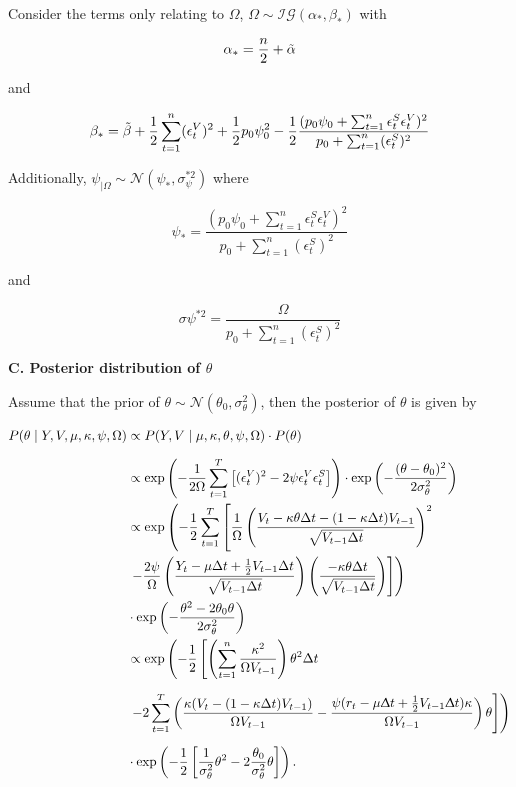 \documentclass[12pt,a4paper]{article}
\numberwithin{equation}{section}
\begin{document}
Consider the terms only relating to $\Omega$, $\Omega \sim \mathcal{IG}(\alpha_*, \beta_*)$ with

\[\alpha_* = \frac{n}{2} + \Tilde{\alpha}\] 

and 

\[\beta_* = \Tilde{\beta} + \frac{1}{2} \sum_{t=1}^n (\epsilon_t^V)^2 + \frac{1}{2} p_0 \psi_0^2 - \frac{1}{2} \frac{(p_0 \psi_0 + \sum_{t=1}^n \epsilon_t^S \epsilon_t^V)^2}{p_0 + \sum_{t=1}^n (\epsilon_t^S )^2} \] 

Additionally, $\psi_{|\Omega} \sim \mathcal{N} (\psi_*, \sigma_\psi^{*2})$ where

\[\psi_* =\frac{(p_0 \psi_0 + \sum_{t=1}^n \epsilon_t^S \epsilon_t^V)^2}{p_0 + \sum_{t=1}^n (\epsilon_t^S )^2} \]

and 

\[\sigma\psi^{*2} = \frac{\Omega}{p_0 + \sum_{t=1}^n (\epsilon_t^S)^2 }\]

\vspace{1em}

\textbf{C. Posterior distribution of $\theta$}

\vspace{1em}

Assume that the prior of $\theta \sim \mathcal{N}(\theta_0, \sigma_\theta^2)$, then the posterior of $\theta$ is given by

\begin{align*}
P(\theta \mid Y, V, \mu, \kappa, \psi, \Omega) & \propto P(Y, V \mid \mu, \kappa, \theta, \psi, \Omega) \cdot P(\theta) \\[0.6em]
& \propto \exp\left( -\frac{1}{2\Omega} \sum_{t=1}^{T} \left[ (\epsilon_t^V)^2 - 2\psi \epsilon_t^V \epsilon_t^S \right] \right) \cdot \exp\left( -\frac{(\theta - \theta_0)^2}{2\sigma_\theta^2} \right)\\
& \propto \exp\left( -\frac{1}{2} \sum_{t=1}^{T} \left[ \frac{1}{\Omega} \left( \frac{V_t - \kappa \theta \Delta t - (1 - \kappa \Delta t)V_{t-1}}{\sqrt{V_{t-1} \Delta t}} \right)^2 \right. \right. \\
& \left. \left. - \frac{2\psi}{\Omega} \left( \frac{Y_t - \mu \Delta t + \frac{1}{2} V_{t-1} \Delta t}{\sqrt{V_{t-1} \Delta t}} \right) \left( \frac{-\kappa \theta \Delta t}{\sqrt{V_{t-1} \Delta t}} \right) \right] \right) \\
& \cdot \exp\left( -\frac{\theta^2 - 2\theta_0 \theta}{2\sigma_\theta^2} \right)\\
& \propto\exp\left(-\frac{1}{2} \left[\left(\sum_{t=1}^n \frac{\kappa^2}{\Omega V_{t-1}}\right) \theta^2 \Delta t \right. \right. \\[0.6em] 
& \left. \left. - 2\sum_{t=1}^T \left(\frac{\kappa (V_t - (1-\kappa \Delta t) V_{t-1})}{\Omega V_{t-1}} - \frac{\psi (r_t -\mu \Updelta t + \frac{1}{2} V_{t-1} \Updelta t) \kappa}{\Omega V_{t-1}} \right) \theta \right] \right) \\[0.6em]
& \cdot \exp\left(-\frac{1}{2} \left[\frac{1}{\sigma_\theta^2} \theta^2 - 2 \frac{\theta_0}{\sigma_\theta^2} \theta \right] \right).
\end{align*}
\end{document}
